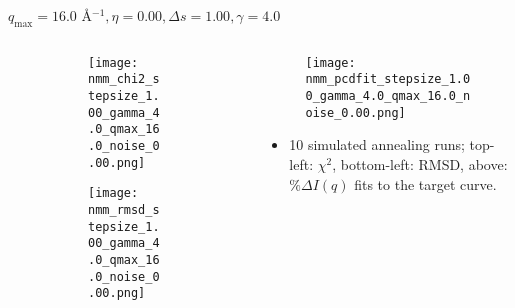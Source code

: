 \documentclass{beamer}
\begin{document}
\begin{frame}{$ q_{\textrm{max}}=16.0 $ \AA $^{-1}, \eta=0.00, \Delta s=1.00, \gamma=4.0$}
	\begin{columns}
		\begin{column}{.5\textwidth}
			\begin{figure}[H]
			\centering
			\begin{subfigure}[b]{\textwidth}
				\centering
				\texttt{[image: nmm\_chi2\_stepsize\_1.00\_gamma\_4.0\_qmax\_16.0\_noise\_0.00.png]}
				\label{fig:}
			\end{subfigure}
			\begin{subfigure}[b]{\textwidth}
				\centering
				\texttt{[image: nmm\_rmsd\_stepsize\_1.00\_gamma\_4.0\_qmax\_16.0\_noise\_0.00.png]}
				\label{fig:}
			\end{subfigure}
			\end{figure}
		\end{column}
		\begin{column}{.5\textwidth}
			\begin{figure}[H]
				\centering
				\texttt{[image: nmm\_pcdfit\_stepsize\_1.00\_gamma\_4.0\_qmax\_16.0\_noise\_0.00.png]}
				\label{fig:}
			\end{figure}
			\begin{itemize}
				\item 10 simulated annealing runs; top-left: $\chi^2$, bottom-left: RMSD, above: $\%\Delta I(q)$ fits to the target curve.
			\end{itemize}
		\end{column}
	\end{columns}
\end{frame}
 
\end{document}
